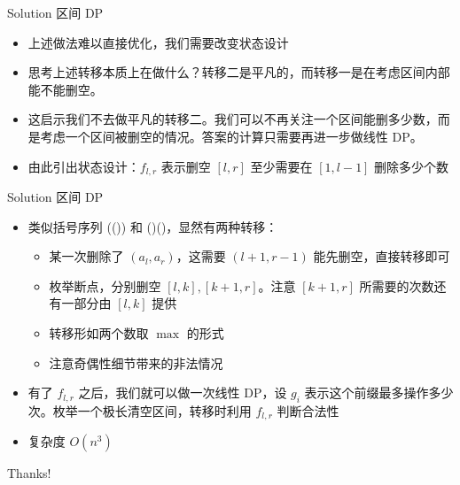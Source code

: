 ﻿\documentclass[aspectratio=169]{ctexbeamer}
\begin{document}
\begin{frame}{Solution}
    区间 DP
    \begin{itemize}
        \item 上述做法难以直接优化，我们需要改变状态设计
        \item 思考上述转移本质上在做什么？转移二是平凡的，而转移一是在考虑区间内部能不能删空。
        \item 这启示我们不去做平凡的转移二。我们可以不再关注一个区间能删多少数，而是考虑一个区间被删空的情况。答案的计算只需要再进一步做线性 DP。
        \item 由此引出状态设计：$f_{l,r}$ 表示删空 $[l,r]$ 至少需要在 $[1,l-1]$ 删除多少个数
    \end{itemize}
\end{frame}


\begin{frame}{Solution}
    区间 DP
    \begin{itemize}
        \item 类似括号序列 (()) 和 ()()，显然有两种转移：
        \begin{itemize}
            \item 某一次删除了 $(a_l,a_r)$，这需要 $(l+1,r-1)$ 能先删空，直接转移即可
            \item 枚举断点，分别删空 $[l,k],[k+1,r]$。注意 $[k+1,r]$ 所需要的次数还有一部分由 $[l,k]$ 提供
            \item 转移形如两个数取 $\max$ 的形式
            \item 注意奇偶性细节带来的非法情况
        \end{itemize}
        \item 有了 $f_{l,r}$ 之后，我们就可以做一次线性 DP，设 $g_i$ 表示这个前缀最多操作多少次。枚举一个极长清空区间，转移时利用 $f_{l,r}$ 判断合法性
        \item 复杂度 $O(n^3)$
    \end{itemize}
\end{frame}






\begin{frame}
    \begin{center}
        {\Huge\calligra Thanks!}
    \end{center}
\end{frame}
\end{document}
